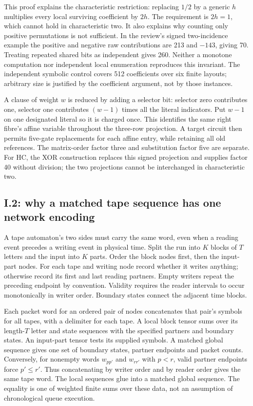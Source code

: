 \documentclass[11pt,letterpaper]{article}
\theoremstyle{definition}\newtheorem{definition}[theorem]{Definition}\newtheorem{example}[theorem]{Example}
\theoremstyle{remark}\newtheorem{remark}[theorem]{Remark}
\begin{document}
This proof explains the characteristic restriction: replacing $1/2$ by a generic $h$ multiplies every local surviving coefficient by $2h$. The requirement is $2h=1$, which cannot hold in characteristic two. It also explains why counting only positive permutations is not sufficient. In the review's signed two-incidence example the positive and negative raw contributions are 213 and $-143$, giving 70. Treating repeated shared bits as independent gives 260. Neither a monotone computation nor independent local enumeration reproduces this invariant. The independent symbolic control covers 512 coefficients over six finite layouts; arbitrary size is justified by the coefficient argument, not by those instances.

A clause of weight $w$ is reduced by adding a selector bit: selector zero contributes one, selector one contributes $(w-1)$ times all the literal indicators. Put $w-1$ on one designated literal so it is charged once. This identifies the same right fibre's affine variable throughout the three-row projection. A target circuit then permits five-gate replacements for each affine entry, while retaining all old references. The matrix-order factor three and substitution factor five are separate. For HC, the XOR construction replaces this signed projection and supplies factor 40 without division; the two projections cannot be interchanged in characteristic two.

\subsection{I.2: why a matched tape sequence has one network encoding}\label{sec:runnetdetail}
A tape automaton's two sides must carry the same word, even when a reading event precedes a writing event in physical time. Split the run into $K$ blocks of $T$ letters and the input into $K$ parts. Order the block nodes first, then the input-part nodes. For each tape and writing node record whether it writes anything; otherwise record its first and last reading partners. Empty writers repeat the preceding endpoint by convention. Validity requires the reader intervals to occur monotonically in writer order. Boundary states connect the adjacent time blocks.

Each packet word for an ordered pair of nodes concatenates that pair's symbols for all tapes, with a delimiter for each tape. A local block tensor sums over its length-$T$ letter and state sequences with the specified partners and boundary states. An input-part tensor tests its supplied symbols. A matched global sequence gives one set of boundary states, partner endpoints and packet counts. Conversely, for nonempty words $w_{pp'}$ and $w_{rr'}$ with $p<r$, valid partner endpoints force $p'\le r'$. Thus concatenating by writer order and by reader order gives the same tape word. The local sequences glue into a matched global sequence. The equality is one of weighted finite sums over these data, not an assumption of chronological queue execution.
\end{document}
